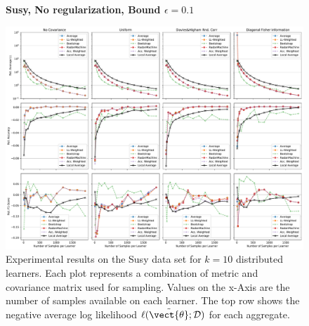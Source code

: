 \begin{landscape}
    \begin{figure}
        \centering
        \textbf{Susy, No regularization, Bound $\epsilon=0.1$}\par\medskip
        \includegraphics[height=\dimexpr \textheight - 1\baselineskip\relax]{kapitel/figures/susy_None_0.1_neg_relative.pdf}
        \caption[Susy plots without regularization and $\epsilon=0.1$]{Experimental results on the Susy data set for $k=10$ distributed learners. Each plot represents a combination of metric and covariance matrix used for sampling. Values on the x-Axis are the number of samples available on each learner. The top row shows the negative average log likelihood $\ell(\tilde{\vect{\theta}}; \mathcal{D})$ for each aggregate.}
        \label{fig:analysis4}
    \end{figure}
    \end{landscape}
